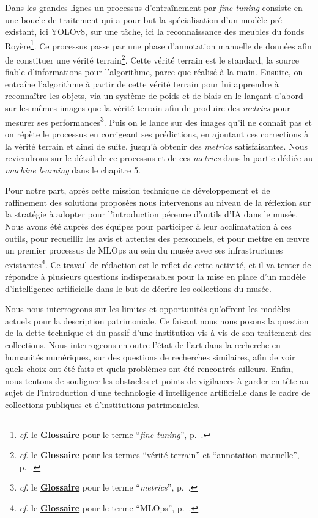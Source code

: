 \documentclass[12pt,twoside]{book}
\begin{document}
Dans les grandes lignes un processus d'entraînement par \textit{fine-tuning} consiste en une boucle de traitement qui a pour but la spécialisation d'un modèle pré-existant, ici YOLOv8, sur une tâche, ici la reconnaissance des meubles du fonds Royère\footnote{\textit{cf}. le \textbf{\hyperref[sec:Glossaire]{Glossaire}} pour le terme \enquote{\textit{fine-tuning}}, p.~\pageref{sec:Glossaire}.}. Ce processus passe par une phase d'annotation manuelle de données afin de constituer une vérité terrain\footnote{\textit{cf}. le \textbf{\hyperref[sec:Glossaire]{Glossaire}} pour les termes \enquote{vérité terrain} et \enquote{annotation manuelle}, p.~\pageref{sec:Glossaire}.}. Cette vérité terrain est le standard, la source fiable d'informations pour l'algorithme, parce que réalisé à la main. Ensuite, on entraîne l'algorithme à partir de cette vérité terrain pour lui apprendre à reconnaître les objets, via un système de poids et de biais en le lançant d'abord sur les mêmes images que la vérité terrain afin de produire des \textit{metrics} pour mesurer ses performances\footnote{\textit{cf}. le \textbf{\hyperref[sec:Glossaire]{Glossaire}} pour le terme \enquote{\textit{metrics}}, p.~\pageref{sec:Glossaire}.}. Puis on le lance sur des images qu'il ne connaît pas et on répète le processus en corrigeant ses prédictions, en ajoutant ces corrections à la vérité terrain et ainsi de suite, jusqu’à obtenir des \textit{metrics} satisfaisantes. Nous reviendrons sur le détail de ce processus et de ces \textit{metrics} dans la partie dédiée au \textit{machine learning} dans le chapitre 5.

Pour notre part, après cette mission technique de développement et de raffinement des solutions proposées nous intervenons au niveau de la réflexion sur la stratégie à adopter pour l'introduction pérenne d'outils d'IA dans le musée. Nous avons été auprès des équipes pour participer à leur acclimatation à ces outils, pour recueillir les avis et attentes des personnels, et pour mettre en œuvre un premier processus de MLOps au sein du musée avec ses infrastructures existantes\footnote{\textit{cf}. le \textbf{\hyperref[sec:Glossaire]{Glossaire}} pour le terme \enquote{MLOps}, p.~\pageref{sec:Glossaire}.}. Ce travail de rédaction est le reflet de cette activité, et il va tenter de répondre à plusieurs questions indispensables pour la mise en place d'un modèle d'intelligence artificielle dans le but de décrire les collections du musée. 

Nous nous interrogeons sur les limites et opportunités qu'offrent les modèles actuels pour la description patrimoniale. Ce faisant nous nous posons la question de la dette technique et du passif d'une institution vis-à-vis de son traitement des collections. Nous interrogeons en outre l'état de l'art dans la recherche en humanités numériques, sur des questions de recherches similaires, afin de voir quels choix ont été faits et quels problèmes ont été rencontrés ailleurs. Enfin, nous tentons de souligner les obstacles et points de vigilances à garder en tête au sujet de l'introduction d'une technologie d'intelligence artificielle dans le cadre de collections publiques et d'institutions patrimoniales.
\end{document}
